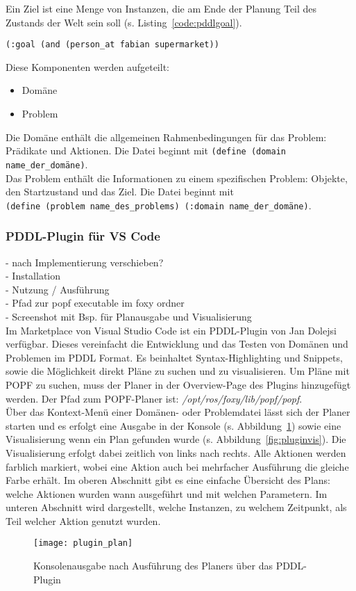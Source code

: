 Ein Ziel ist eine Menge von Instanzen, die am Ende der Planung Teil des Zustands der Welt sein soll (s. Listing~\ref{code:pddlgoal}).
\begin{lstlisting}[caption={Ziel in PDDL},language=pddl,label=code:pddlgoal]
(:goal (and (person_at fabian supermarket))
\end{lstlisting}
Diese Komponenten werden aufgeteilt:
\begin{itemize}
    \item Domäne
    \item Problem
\end{itemize}
Die Domäne enthält die allgemeinen Rahmenbedingungen für das Problem: Prädikate und Aktionen.
Die Datei beginnt mit \verb|(define (domain name_der_domäne)|.\\
Das Problem enthält die Informationen zu einem spezifischen Problem: Objekte, den Startzustand und das Ziel.
Die Datei beginnt mit\\\verb|(define (problem name_des_problems) (:domain name_der_domäne)|.\\

\subsubsection{PDDL-Plugin für VS Code}
- nach Implementierung verschieben?\\
- Installation\\
- Nutzung / Ausführung\\
- Pfad zur popf executable im foxy ordner\\
- Screenshot mit Bsp. für Planausgabe und Visualisierung\\
Im Marketplace von Visual Studio Code ist ein PDDL-Plugin von Jan Dolejsi verfügbar.
Dieses vereinfacht die Entwicklung und das Testen von Domänen und Problemen im PDDL Format.
Es beinhaltet Syntax-Highlighting und Snippets, sowie die Möglichkeit direkt Pläne zu suchen und zu visualisieren.
Um Pläne mit \ac{POPF} zu suchen, muss der Planer in der Overview-Page des Plugins hinzugefügt werden.
Der Pfad zum \ac{POPF}-Planer ist: \emph{/opt/ros/foxy/lib/popf/popf}.\\
Über das Kontext-Menü einer Domänen- oder Problemdatei lässt sich der Planer starten und es erfolgt eine Ausgabe in der Konsole (s. Abbildung~\ref{fig:pluginplan}) sowie eine Visualisierung wenn ein Plan gefunden wurde (s. Abbildung~\ref{fig:pluginvis}).
Die Visualisierung erfolgt dabei zeitlich von links nach rechts.
Alle Aktionen werden farblich markiert, wobei eine Aktion auch bei mehrfacher Ausführung die gleiche Farbe erhält.
Im oberen Abschnitt gibt es eine einfache Übersicht des Plans: welche Aktionen wurden wann ausgeführt und mit welchen Parametern.
Im unteren Abschnitt wird dargestellt, welche Instanzen, zu welchem Zeitpunkt, als Teil welcher Aktion genutzt wurden.
\begin{figure}[ht!]
    \centering
    \texttt{[image: plugin\_plan]}
    \caption{Konsolenausgabe nach Ausführung des Planers über das PDDL-Plugin}
    \label{fig:pluginplan}
\end{figure}

